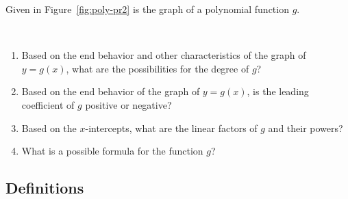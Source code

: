 \begin{myPractice}
	Given in Figure~\ref{fig:poly-pr2} is the graph of a polynomial function $g$. \\
\begin{minipage}{0.35\linewidth}
	\begin{center}
	~\\[-0.8em]
		\label{fig:poly-pr2}
	\end{center}
\end{minipage}
\begin{minipage}{0.65\linewidth}
	\begin{enumerate}
		\item Based on the end behavior and other characteristics of the graph of $y=g(x)$, what are the possibilities for the degree of $g$?\\[0.25in]
		\item Based on the end behavior of the graph of $y=g(x)$, is the leading coefficient of $g$ positive or negative?\\[0.25in]
		\item Based on the $x$-intercepts, what are the linear factors of $g$ and their powers?\\[0.5in]
		\item What is a possible formula for the function $g$?\\[0.25in]
	\end{enumerate}
\end{minipage}


\vfill
\end{myPractice}



\newpage

\subsection*{Definitions} \label{def-functions-polynomial-graphs}

